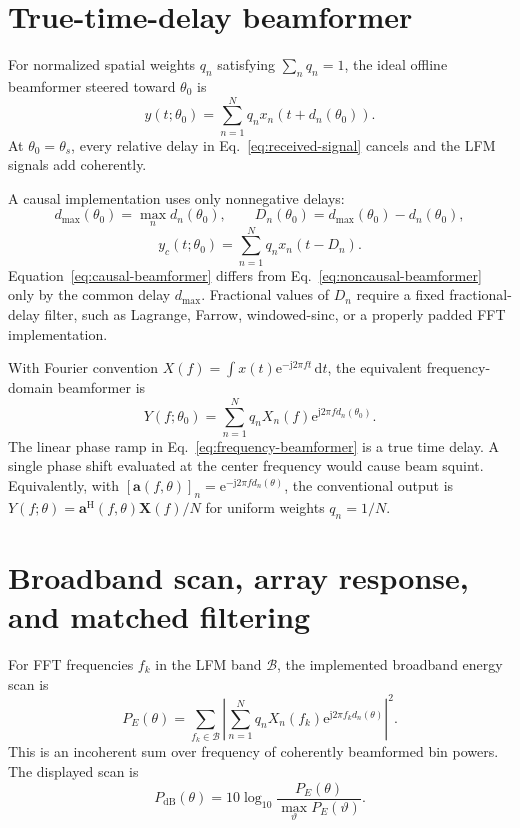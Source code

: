 \documentclass[10pt,a4paper]{article}
\newcommand{\jj}{\mathrm{j}}
\newcommand{\e}{\mathrm{e}}
\newcommand{\dd}{\mathrm{d}}
\begin{document}
\section{True-time-delay beamformer}

For normalized spatial weights $q_n$ satisfying $\sum_nq_n=1$, the ideal offline
beamformer steered toward $\theta_0$ is
\begin{equation}
 y(t;\theta_0)=\sum_{n=1}^{N}q_n
 x_n\!\left(t+d_n(\theta_0)\right).
 \label{eq:noncausal-beamformer}
\end{equation}
At $\theta_0=\theta_s$, every relative delay in Eq.~\eqref{eq:received-signal}
cancels and the LFM signals add coherently.

A causal implementation uses only nonnegative delays:
\begin{equation}
 d_{\max}(\theta_0)=\max_n d_n(\theta_0),
 \qquad
 D_n(\theta_0)=d_{\max}(\theta_0)-d_n(\theta_0),
\end{equation}
\begin{equation}
 y_c(t;\theta_0)=\sum_{n=1}^{N}q_nx_n(t-D_n).
 \label{eq:causal-beamformer}
\end{equation}
Equation~\eqref{eq:causal-beamformer} differs from
Eq.~\eqref{eq:noncausal-beamformer} only by the common delay $d_{\max}$. Fractional
values of $D_n$ require a fixed fractional-delay filter, such as Lagrange, Farrow,
windowed-sinc, or a properly padded FFT implementation.

With Fourier convention $X(f)=\int x(t)\e^{-\jj2\pi ft}\,\dd t$, the equivalent
frequency-domain beamformer is
\begin{equation}
 Y(f;\theta_0)=\sum_{n=1}^{N}q_nX_n(f)
 \e^{\jj2\pi f d_n(\theta_0)}.
 \label{eq:frequency-beamformer}
\end{equation}
The linear phase ramp in Eq.~\eqref{eq:frequency-beamformer} is a true time delay.
A single phase shift evaluated at the center frequency would cause beam squint.
Equivalently, with
$[\boldsymbol a(f,\theta)]_n=\e^{-\jj2\pi f d_n(\theta)}$, the conventional output
is $Y(f;\theta)=\boldsymbol a^{\mathrm H}(f,\theta)\boldsymbol X(f)/N$ for uniform
weights $q_n=1/N$.

\section{Broadband scan, array response, and matched filtering}

For FFT frequencies $f_k$ in the LFM band $\mathcal B$, the implemented broadband
energy scan is
\begin{equation}
 P_E(\theta)=\sum_{f_k\in\mathcal B}
 \left|\sum_{n=1}^{N}q_nX_n(f_k)
 \e^{\jj2\pi f_kd_n(\theta)}\right|^2.
 \label{eq:broadband-scan}
\end{equation}
This is an incoherent sum over frequency of coherently beamformed bin powers. The
displayed scan is
\begin{equation}
 P_{\mathrm{dB}}(\theta)=10\log_{10}
 \frac{P_E(\theta)}{\max_{\vartheta}P_E(\vartheta)}.
\end{equation}
\end{document}
